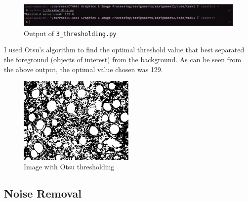 \documentclass[a4paper]{article}
\newenvironment{code}{\captionsetup{type=listing}}{}
\begin{document}
\begin{figure}[H]
    \centering
    \includegraphics[width=\textwidth]{./images/3_thresholding_output.png}
    \caption{Output of \texttt{3_thresholding.py}}
\end{figure}

I used Otsu's algorithm to find the optimal threshold value that best separated the foreground (objects of interest) from the background.
As can be seen from the above output, the optimal value chosen was 129.

\begin{figure}[H]
    \centering
    \includegraphics[width=0.5\textwidth]{../code/task1/output/otsu.jpg}
    \caption{Image with Otsu thresholding}
\end{figure}


\subsection{Noise Removal}
\begin{code}
    \inputminted[linenos, breaklines, frame=single]{python}{../code/task1/4_noise_removal.py}
    \caption{\texttt{4_noise_removal.py}}
\end{code}
\end{document}
